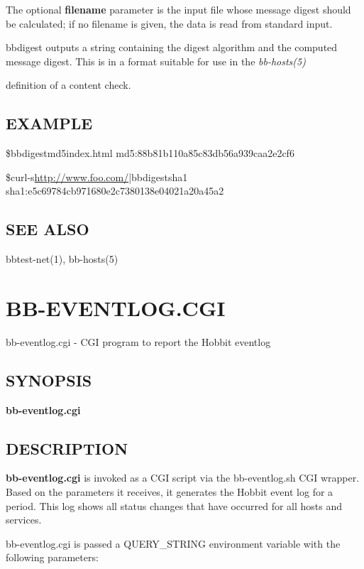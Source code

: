   The optional \textbf{filename} parameter is the input file whose
  message digest should be calculated; if no filename is given, the
  data is read from standard input. 



  bbdigest outputs a string containing the digest algorithm and the
  computed message digest. This is in a format suitable for use in the
  \emph{bb-hosts(5)}

 definition of a content check. 


 
\subsection{EXAMPLE}


\$bbdigestmd5index.html  md5:88b81b110a85c83db56a939caa2e2cf6 
  
\$curl-s\url{http://www.foo.com/}|bbdigestsha1  sha1:e5c69784cb971680e2c7380138e04021a20a45a2 

 
\subsection{SEE ALSO}
bbtest-net(1), bb-hosts(5) 

 


%
\newpage
\section{BB-EVENTLOG.CGI}

 bb-eventlog.cgi - CGI program to report the Hobbit eventlog \subsection{SYNOPSIS}
\textbf{bb-eventlog.cgi}


 

\subsection{DESCRIPTION}
\textbf{bb-eventlog.cgi}
 is invoked as a CGI script via the bb-eventlog.sh CGI wrapper. Based
 on the parameters it receives, it generates the Hobbit event log for
 a period. This log shows all status changes that have occurred for
 all hosts and services. 


  bb-eventlog.cgi is passed a QUERY\_STRING environment variable with the following parameters: 


